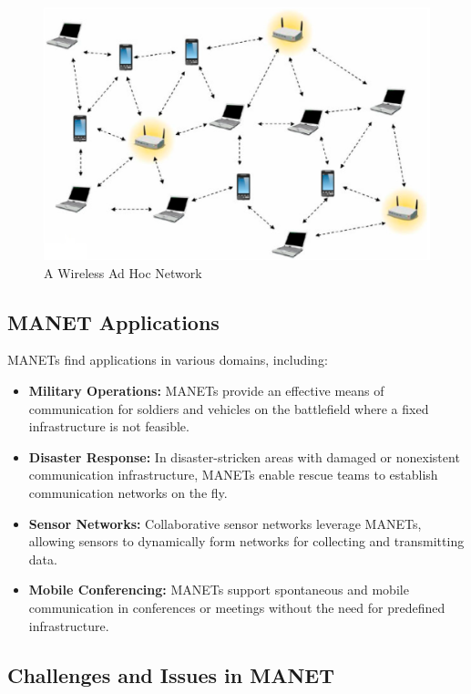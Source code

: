 \documentclass[11pt]{article}
\begin{document}
\begin{figure}[H]
    \centering
    \includegraphics[width=.65\textwidth]{Mobile Ad hoc networks/Mobile Ad hoc networks9.jpg}
    \caption{A Wireless Ad Hoc Network}
\end{figure}

\subsection{MANET Applications}

MANETs find applications in various domains, including:

\begin{itemize}
    \item \textbf{Military Operations:} MANETs provide an effective means of communication for soldiers and vehicles on the battlefield where a fixed infrastructure is not feasible.
    \item \textbf{Disaster Response:} In disaster-stricken areas with damaged or nonexistent communication infrastructure, MANETs enable rescue teams to establish communication networks on the fly.
    \item \textbf{Sensor Networks:} Collaborative sensor networks leverage MANETs, allowing sensors to dynamically form networks for collecting and transmitting data.
    \item \textbf{Mobile Conferencing:} MANETs support spontaneous and mobile communication in conferences or meetings without the need for predefined infrastructure.
\end{itemize}


\subsection{Challenges and Issues in MANET}
\end{document}
